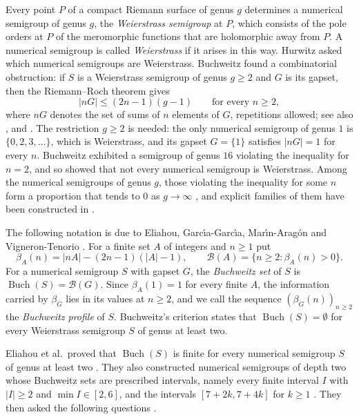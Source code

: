 \documentclass[11pt]{amsart}
\theoremstyle{definition}
\theoremstyle{remark}
\numberwithin{equation}{section}
\newcommand{\B}{\mathcal{B}}
\newcommand{\Buch}{\operatorname{Buch}}
\begin{document}
Every point $P$ of a compact Riemann surface of genus $g$ determines a numerical semigroup of genus $g$, the \emph{Weierstrass semigroup} at $P$, which consists of the pole orders at $P$ of the meromorphic functions that are holomorphic away from $P$. A numerical semigroup is called \emph{Weierstrass} if it arises in this way. Hurwitz \cite{Hur93} asked which numerical semigroups are Weierstrass. Buchweitz \cite{Buc80} found a combinatorial obstruction: if $S$ is a Weierstrass semigroup of genus $g\ge 2$ and $G$ is its gapset, then the Riemann--Roch theorem gives
\[
|nG|\le (2n-1)(g-1)\qquad\text{for every } n\ge 2,
\]
where $nG$ denotes the set of sums of $n$ elements of $G$, repetitions allowed; see also \cite{EH87}, \cite[Proposition~2]{KY13} and \cite[Section~1]{GMTV21}. The restriction $g\ge 2$ is needed: the only numerical semigroup of genus $1$ is $\{0,2,3,\dots\}$, which is Weierstrass, and its gapset $G=\{1\}$ satisfies $|nG|=1$ for every $n$. Buchweitz exhibited a semigroup of genus $16$ violating the inequality for $n=2$, and so showed that not every numerical semigroup is Weierstrass. Among the numerical semigroups of genus $g$, those violating the inequality for some $n$ form a proportion that tends to $0$ as $g\to\infty$ \cite[Theorem~5]{KY13}, and explicit families of them have been constructed in \cite{Kom98, GMTV21, EGMV23}.

The following notation is due to Eliahou, Garc\'{\i}a-Garc\'{\i}a, Mar\'{\i}n-Arag\'on and Vigneron-Tenorio \cite[Definition~1.1, Notation~1.2]{EGMV23}. For a finite set $A$ of integers and $n\ge 1$ put
\[
\beta_A(n)=|nA|-(2n-1)(|A|-1),\qquad \B(A)=\{n\ge 2:\beta_A(n)>0\}.
\]
For a numerical semigroup $S$ with gapset $G$, the \emph{Buchweitz set} of $S$ is $\Buch(S)=\B(G)$. Since $\beta_A(1)=1$ for every finite $A$, the information carried by $\beta_G$ lies in its values at $n\ge 2$, and we call the sequence $(\beta_G(n))_{n\ge 2}$ the \emph{Buchweitz profile} of $S$. Buchweitz's criterion states that $\Buch(S)=\emptyset$ for every Weierstrass semigroup $S$ of genus at least two.

Eliahou et al.\ proved that $\Buch(S)$ is finite for every numerical semigroup $S$ of genus at least two \cite[Theorem~3.3]{EGMV23}. They also constructed numerical semigroups of depth two whose Buchweitz sets are prescribed intervals, namely every finite interval $I$ with $|I|\ge 2$ and $\min I\in[2,6]$, and the intervals $[7+2k,7+4k]$ for $k\ge 1$ \cite[Sections~3.2 and 3.3]{EGMV23}. They then asked the following questions \cite[Section~4]{EGMV23}.
\end{document}

